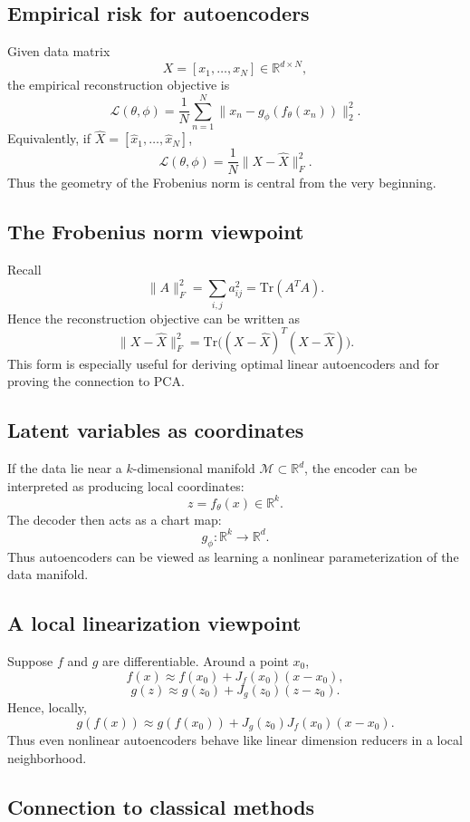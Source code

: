 \documentclass[%
oneside,                 %
final,                   %
10pt]{article}
\begin{document}
\subsection{Empirical risk for autoencoders}

Given data matrix
\[
X = [x_1,\dots,x_N] \in \mathbb{R}^{d\times N},
\]
the empirical reconstruction objective is
\[
\mathcal{L}(\theta,\phi)
=
\frac{1}{N}\sum_{n=1}^N \|x_n-g_\phi(f_\theta(x_n))\|_2^2.
\]
Equivalently, if \(\hat X=[\hat x_1,\dots,\hat x_N]\),
\[
\mathcal{L}(\theta,\phi)=\frac{1}{N}\|X-\hat X\|_F^2.
\]
Thus the geometry of the Frobenius norm is central from the very beginning.

\subsection{The Frobenius norm viewpoint}

Recall
\[
\|A\|_F^2 = \sum_{i,j} a_{ij}^2 = \mathrm{Tr}(A^T A).
\]
Hence the reconstruction objective can be written as
\[
\|X-\hat X\|_F^2
=
\mathrm{Tr}\bigl((X-\hat X)^T(X-\hat X)\bigr).
\]
This form is especially useful for deriving optimal linear autoencoders and for proving the connection to PCA.

\subsection{Latent variables as coordinates}

If the data lie near a \(k\)-dimensional manifold \(\mathcal{M}\subset\mathbb{R}^d\), the encoder can be interpreted as producing local coordinates:
\[
z=f_\theta(x)\in \mathbb{R}^k.
\]
The decoder then acts as a chart map:
\[
g_\phi: \mathbb{R}^k \to \mathbb{R}^d.
\]
Thus autoencoders can be viewed as learning a nonlinear parameterization of the data manifold.

\subsection{A local linearization viewpoint}

Suppose \(f\) and \(g\) are differentiable. Around a point \(x_0\),
\[
f(x) \approx f(x_0) + J_f(x_0)(x-x_0),
\]
\[
g(z) \approx g(z_0) + J_g(z_0)(z-z_0).
\]
Hence, locally,
\[
g(f(x)) \approx g(f(x_0)) + J_g(z_0)J_f(x_0)(x-x_0).
\]
Thus even nonlinear autoencoders behave like linear dimension reducers in a local neighborhood.

\subsection{Connection to classical methods}
\end{document}
